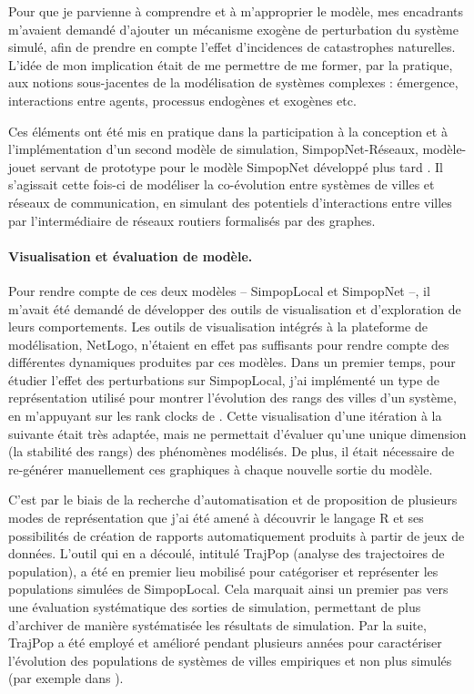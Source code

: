 Pour que je parvienne à comprendre et à m'approprier le modèle, mes encadrants m'avaient demandé d'ajouter un mécanisme exogène de perturbation du système simulé, afin de prendre en compte l'effet d'incidences de catastrophes naturelles. 
L'idée de mon implication était de me permettre de me former, par la pratique, aux notions sous-jacentes de la modélisation de systèmes complexes : émergence, interactions entre agents, processus endogènes et exogènes etc.

Ces éléments ont été mis en pratique dans la participation à la conception et à l'implémentation d'un second modèle de simulation, \og SimpopNet-Réseaux\fg{}, \og modèle-jouet\fg{} servant de prototype pour le modèle SimpopNet développé plus tard \autocite{schmitt_modelisation_2014}.
Il s'agissait cette fois-ci de modéliser la co-évolution entre systèmes de villes et réseaux de communication, en simulant des potentiels d'interactions entre villes par l'intermédiaire de réseaux routiers formalisés par des graphes.

\paragraph{Visualisation et évaluation de modèle.}

Pour rendre compte de ces deux modèles -- SimpopLocal et SimpopNet --, il m'avait été demandé de développer des outils de visualisation et d'exploration de leurs comportements.
Les outils de visualisation intégrés à la plateforme de modélisation, NetLogo, n'étaient en effet pas suffisants pour rendre compte des différentes dynamiques produites par ces modèles.
Dans un premier temps, pour étudier l'effet des perturbations sur SimpopLocal, j'ai implémenté un type de représentation utilisé pour montrer l'évolution des rangs des villes d'un système, en m'appuyant sur les \og rank clocks\fg{} de \textcite{batty_rank_2006}.
Cette visualisation d'une itération à la suivante était très adaptée, mais ne permettait d'évaluer qu'une unique dimension (la stabilité des rangs) des phénomènes modélisés.
De plus, il était nécessaire de re-générer manuellement ces graphiques à chaque nouvelle sortie du modèle.

C'est par le biais de la recherche d'automatisation et de proposition de plusieurs modes de représentation que j'ai été amené à découvrir le langage R et ses possibilités de création de rapports automatiquement produits à partir de jeux de données.
L'outil qui en a découlé, intitulé TrajPop (analyse des trajectoires de population), a été en premier lieu mobilisé pour catégoriser et représenter les populations simulées de SimpopLocal.
Cela marquait ainsi un premier pas vers une évaluation systématique des sorties de simulation, permettant de plus d'archiver de manière systématisée les résultats de simulation.
Par la suite, TrajPop a été employé et amélioré pendant plusieurs années pour caractériser l'évolution des populations de systèmes de villes empiriques et non plus simulés (par exemple dans \textcite{pumain_multilevel_2015}).

